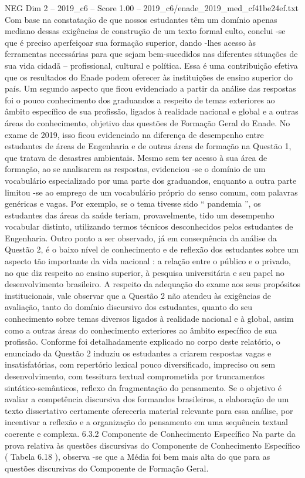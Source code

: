 \begin{textsample}{NEG Dim 2 – 2019\_c6 – Score 1.00 – 2019\_c6/enade\_2019\_med\_cf41be24ef.txt}
Com base na constatação de que nossos estudantes têm um domínio apenas mediano dessas exigências de construção de um texto formal culto, conclui -se que é preciso aperfeiçoar sua formação superior, dando -lhes acesso às ferramentas necessárias para que sejam bem-sucedidos nas diferentes situações de sua vida cidadã – profissional, cultural e política.
Essa é uma contribuição efetiva que os resultados do Enade podem oferecer às instituições de ensino superior do país.
Um segundo aspecto que ficou evidenciado a partir da análise das respostas foi o pouco conhecimento dos graduandos a respeito de temas exteriores ao âmbito específico de sua profissão, ligados à realidade nacional e global e a outras áreas do conhecimento, objetivo das questões de Formação Geral do Enade.
No exame de 2019, isso ficou evidenciado na diferença de desempenho entre estudantes de áreas de Engenharia e de outras áreas de formação na Questão 1, que tratava de desastres ambientais.
Mesmo sem ter acesso à sua área de formação, ao se analisarem as respostas, evidenciou -se o domínio de um vocabulário especializado por uma parte dos graduandos, enquanto a outra parte limitou -se ao emprego de um vocabulário próprio do senso comum, com palavras genéricas e vagas.
Por exemplo, se o tema tivesse sido “ pandemia ”, os estudantes das áreas da saúde teriam, provavelmente, tido um desempenho vocabular distinto, utilizando termos técnicos desconhecidos pelos estudantes de Engenharia.
Outro ponto a ser observado, já em consequência da análise da Questão 2, é o baixo nível de conhecimento e de reflexão dos estudantes sobre um aspecto tão importante da vida nacional : a relação entre o público e o privado, no que diz respeito ao ensino superior, à pesquisa universitária e seu papel no desenvolvimento brasileiro.
A respeito da adequação do exame aos seus propósitos institucionais, vale observar que a Questão 2 não atendeu às exigências de avaliação, tanto do domínio discursivo dos estudantes, quanto do seu conhecimento sobre temas diversos ligados à realidade nacional e à global, assim como a outras áreas do conhecimento exteriores ao âmbito específico de sua profissão.
Conforme foi detalhadamente explicado no corpo deste relatório, o enunciado da Questão 2 induziu os estudantes a criarem respostas vagas e insatisfatórias, com repertório lexical pouco diversificado, impreciso ou sem desenvolvimento, com tessitura textual comprometida por truncamentos sintático-semânticos, reflexo da fragmentação do pensamento.
Se o objetivo é avaliar a competência discursiva dos formandos brasileiros, a elaboração de um texto dissertativo certamente ofereceria material relevante para essa análise, por incentivar a reflexão e a organização do pensamento em uma sequência textual coerente e complexa. 6.3.2 Componente de Conhecimento Específico Na parte da prova relativa às questões discursivas do Componente de Conhecimento Específico ( Tabela 6.18 ), observa -se que a Média foi bem mais alta do que para as questões discursivas do Componente de Formação Geral.

\end{textsample}
